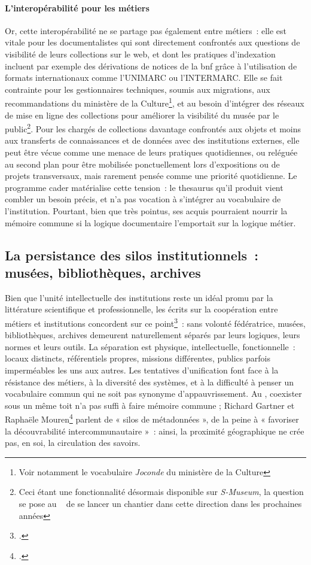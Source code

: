 \paragraph*{L'interopérabilité pour les métiers}
Or, cette interopérabilité ne se partage pas également entre métiers~: elle est vitale pour les documentalistes qui sont directement confrontés aux questions de visibilité de leurs collections sur le web, et dont les pratiques d'indexation incluent par exemple des dérivations de notices de la \ac{bnf} grâce à l'utilisation de formats internationaux comme l'UNIMARC ou l'INTERMARC. Elle se fait contrainte pour les gestionnaires techniques, soumis aux migrations, aux recommandations du ministère de la Culture\footnote{Voir notamment le vocabulaire \textit{Joconde} du ministère de la Culture}, et au besoin d’intégrer des réseaux de mise en ligne des collections pour améliorer la visibilité du musée par le public\footnote{Ceci étant une fonctionnalité désormais disponible sur \textit{S-Museum}, la question se pose au \mae~ de se lancer un chantier dans cette direction dans les prochaines années}. Pour les chargés de collections davantage confrontés aux objets et moins aux transferts de connaissances et de données avec des institutions externes, elle peut être vécue comme une menace de leurs pratiques quotidiennes, ou reléguée au second plan pour être mobilisée ponctuellement lors d’expositions ou de projets transversaux, mais rarement pensée comme une priorité quotidienne. Le programme \gls{cader} matérialise cette tension~: le \gls{thesaurus} qu’il produit vient combler un besoin précis, et n’a pas vocation à s’intégrer au vocabulaire de l'institution. Pourtant, bien que très pointus, ses acquis pourraient nourrir la mémoire commune si la logique documentaire l’emportait sur la logique métier.

\subsection{La persistance des silos institutionnels~: musées, bibliothèques, archives}

Bien que l'unité intellectuelle des institutions reste un idéal promu par la littérature scientifique et professionnelle, les écrits sur la coopération entre métiers et institutions concordent sur ce point\footcite{gartnerArchivesMuseumsLibraries2019,rossini-paquetBibliothequesMuseesQuellesa,yarrowBibliothequesPubliquesArchives2008a}~: sans volonté fédératrice, musées, bibliothèques, archives demeurent naturellement séparés par leurs logiques, leurs normes et leurs outils. La séparation est physique, intellectuelle, fonctionnelle~: locaux distincts, référentiels propres, missions différentes, publics parfois imperméables les uns aux autres. Les tentatives d’unification font face à la résistance des métiers, à la diversité des systèmes, et à la difficulté à penser un vocabulaire commun qui ne soit pas synonyme d’appauvrissement. Au \mae, coexister sous un même toit n’a pas suffi à faire mémoire commune ; Richard Gartner et Raphaële Mouren\footcite{gartnerArchivesMuseumsLibraries2019} parlent de « silos de métadonnées », de la peine à « favoriser la découvrabilité intercommunautaire »~: ainsi, la proximité géographique ne crée pas, en soi, la circulation des savoirs.

